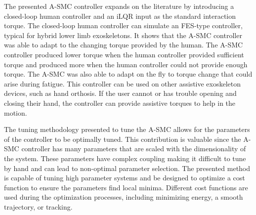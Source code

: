 The presented A-SMC controller expands on the literature by introducing a closed-loop human controller and an iLQR input as the standard interaction torque. The closed-loop human controller can simulate an FES-type controller, typical for hybrid lower limb exoskeletons. It shows that the A-SMC controller was able to adapt to the changing torque provided by the human. The A-SMC controller produced lower torque when the human controller provided sufficient torque and produced more when the human controller could not provide enough torque. The A-SMC was also able to adapt on the fly to torque change that could arise during fatigue. This controller can be used on other assistive exoskeleton devices, such as hand orthosis. If the user cannot or has trouble opening and closing their hand, the controller can provide assistive torques to help in the motion. 

The tuning methodology presented to tune the A-SMC allows for the 
parameters of the controller to be optimally tuned. This contribution is valuable since the A-SMC controller has many parameters that are scaled with the dimensionality of the system. These parameters have complex coupling making it difficult to tune by hand and can lead to non-optimal parameter selection. The presented method is capable of tuning high parameter systems and be designed to optimize a cost function to ensure the parameters find local minima. Different cost functions are used during the optimization processes, including minimizing energy,  a smooth trajectory, or tracking.   



